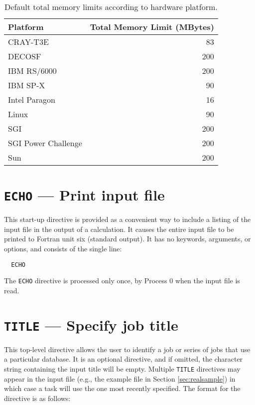 
\begin{table}

\center

\label{tbl:default-memory-limits}

\begin{tabular}{lr}
\hline\hline
Platform        & Total Memory Limit (MBytes) \\
\hline
CRAY-T3E        & 83 \\
DECOSF          & 200 \\
IBM RS/6000     & 200 \\
IBM SP-X        & 90 \\
Intel Paragon   & 16 \\
Linux           & 90 \\
SGI             & 200 \\
SGI Power Challenge  & 200 \\
Sun             & 200 \\
\hline\hline
\end{tabular}

\caption{Default total memory limits according to hardware platform.}


\end{table}

\section{{\tt ECHO} --- Print input file}
\label{sec:echo}

This start-up directive is provided as a convenient way to include a
listing of the input file in the output of a calculation.  It causes
the entire input file to be printed to Fortran unit six (standard
output).  It has no keywords, arguments, or options, and consists of
the single line:

\begin{verbatim}
  ECHO
\end{verbatim}

The \verb+ECHO+ directive is processed only
once, by Process 0 when the input file is read.

\section{{\tt TITLE} --- Specify job title}

This top-level directive allows the user to identify a job or series
of jobs that use a particular database.  It is an optional directive,
and if omitted, the character string containing the input title will
be empty.  Multiple {\tt TITLE} directives may appear in the input
file (e.g., the example file in Section \ref{sec:realsample}) in which
case a task will use the one most recently specified.  The format for
the directive is as follows:

